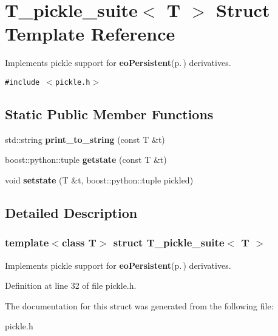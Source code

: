 \section{T\_\-pickle\_\-suite$<$ T $>$ Struct Template Reference}
\label{struct_t__pickle__suite}
Implements pickle support for {\bf eo\-Persistent}{\rm (p.\,\pageref{classeo_persistent})} derivatives.  


{\tt \#include $<$pickle.h$>$}

\subsection*{Static Public Member Functions}
\begin{CompactItemize}
\item 
std::string {\bf print\_\-to\_\-string} (const T \&t)\label{struct_t__pickle__suite_e0}

\item 
boost::python::tuple {\bf getstate} (const T \&t)\label{struct_t__pickle__suite_e1}

\item 
void {\bf setstate} (T \&t, boost::python::tuple pickled)\label{struct_t__pickle__suite_e2}

\end{CompactItemize}


\subsection{Detailed Description}
\subsubsection*{template$<$class T$>$ struct T\_\-pickle\_\-suite$<$ T $>$}

Implements pickle support for {\bf eo\-Persistent}{\rm (p.\,\pageref{classeo_persistent})} derivatives. 



Definition at line 32 of file pickle.h.

The documentation for this struct was generated from the following file:\begin{CompactItemize}
\item 
pickle.h\end{CompactItemize}
